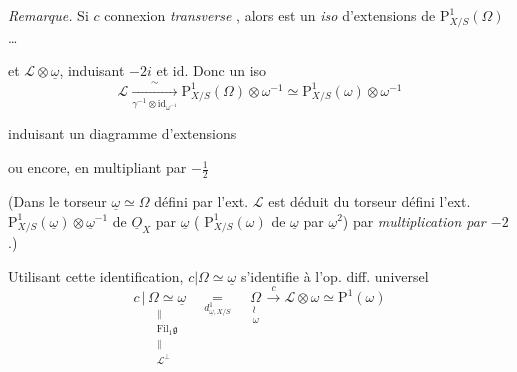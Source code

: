 \documentclass[11pt,a4paper]{article}
\begin{document}
\emph{Remarque.} Si $c$ connexion \emph{transverse} , alors  est un \emph{iso} d'extensions de $\mathrm{P}^1_{X/S}(\Omega)$ \ldots
{}

et $\mathcal{L}\otimes\underline{\omega}$, induisant $-2i$ et $\mathrm{id}$. Donc un iso
\[
\mathcal{L} \xrightarrow[\gamma^{-1}\otimes\mathrm{id}_{\omega^{-1}}]{\ \sim\ } \mathrm{P}^1_{X/S}(\Omega)\otimes\omega^{-1} \simeq \mathrm{P}^1_{X/S}(\omega)\otimes\omega^{-1}
\]

induisant un diagramme d'extensions


ou encore, en multipliant par $-\frac{1}{2}$


(Dans le torseur  $\underline{\omega} \simeq \Omega$ défini par l'ext. $\mathcal{L}$ est déduit du torseur défini  l'ext. $\mathrm{P}^1_{X/S}(\underline{\omega})\otimes\underline{\omega}^{-1}$ de $\underline{O}_X$ par $\underline{\omega}$ ( $\mathrm{P}^1_{X/S}(\omega)$ de $\underline{\omega}$ par $\underline{\omega}^2$) par \emph{multiplication par $-2$}.)

Utilisant cette identification, $c|\Omega \simeq \underline{\omega}$ s'identifie à l'op. diff. universel
\[
c\,|\,\underset{\substack{\|\\ \mathrm{Fil}_1\mathfrak{g}\\ \|\\ \mathcal{L}^{\perp}}}{\Omega \simeq \underline{\omega}}
\quad \underset{d^1_{\underline{\omega},X/S}}{=} \quad
\underset{\substack{\wr\\ \omega}}{\Omega} \xrightarrow{\ c\ } \mathcal{L}\otimes\omega \simeq \mathrm{P}^1(\omega)
\]
\end{document}
